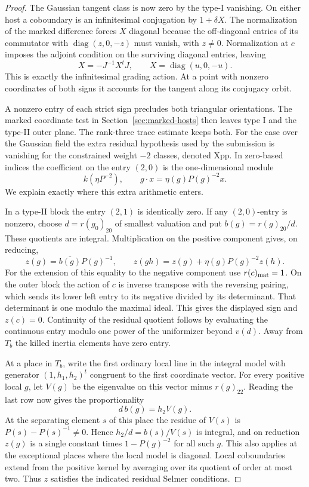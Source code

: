\begin{proof}
The Gaussian tangent class is now zero by the type-I
vanishing. On either host a coboundary is an
infinitesimal conjugation by \(1+\delta X\). The
normalization of the marked difference forces \(X\)
diagonal because the off-diagonal entries of its commutator
with \(\operatorname{diag}(z,0,-z)\) must vanish, with
\(z\ne0\). Normalization at \(c\) imposes the adjoint condition on the surviving diagonal entries, leaving
\[
 X=-J^{-1}X^tJ,\qquad X=\operatorname{diag}(u,0,-u).
\] This is exactly the
infinitesimal grading action. At a point with nonzero
coordinates of both signs it accounts for the tangent
along its conjugacy orbit.

A nonzero entry of each strict sign precludes both triangular
orientations. The marked coordinate test in
Section~\ref{sec:marked-hosts} then leaves type I and the
type-II outer plane. The rank-three trace estimate keeps both. For the case over the Gaussian field the
extra residual hypothesis used by the submission is vanishing
for the constrained weight \(-2\) classes, denoted
\(\mathrm{Xpp}\). In zero-based indices the coefficient on the entry \((2,0)\) is the one-dimensional module
\[
 k(\eta P^{-2}),\qquad g\cdot x=\eta(g)P(g)^{-2}x .
\] We explain exactly where this extra
arithmetic enters.

In a type-II block the entry \((2,1)\) is identically zero.
If any \((2,0)\)-entry is nonzero, choose \(d=r(g_0)_{20}\)
of smallest valuation and put \(b(g)=r(g)_{20}/d\).
These quotients are integral. Multiplication on the positive
component gives, on reducing,
\[
  z(g)=\overline{b(g)}P(g)^{-1},\qquad
  z(gh)=z(g)+\eta(g)P(g)^{-2}z(h).
\]
For the extension of this equality to the negative component
use \(r(c)_{\rm mat}=1\). On the outer block the action of
\(c\) is inverse transpose with the reversing pairing, which
sends its lower left entry to its negative divided by its
determinant. That determinant is one modulo the maximal
ideal. This gives the displayed sign and \(z(c)=0\).
Continuity of the residual quotient follows by evaluating
the continuous entry modulo one power of the uniformizer
beyond \(v(d)\). Away from \(T_b\) the killed inertia
elements have zero entry.

At a place in \(T_b\), write
the first ordinary local line in the integral model with
generator \((1,h_1,h_2)^t\) congruent to the first coordinate
vector. For every positive local \(g\), let \(V(g)\) be
the eigenvalue on this vector minus \(r(g)_{22}\).
Reading the last row now gives the proportionality
\[
 d\,b(g)=h_2 V(g).
\] At the separating
element \(s\) of this place the residue of \(V(s)\) is
\(P(s)-P(s)^{-1}\ne0\). Hence \(h_2/d=b(s)/V(s)\)
is integral, and on reduction \(z(g)\) is a single
constant times \(1-P(g)^{-2}\) for all such \(g\).
This also applies at the exceptional places where the
local model is diagonal. Local coboundaries extend from
the positive kernel by averaging over its quotient of
order at most two. Thus \(z\) satisfies the indicated
residual Selmer conditions.


\end{proof}
